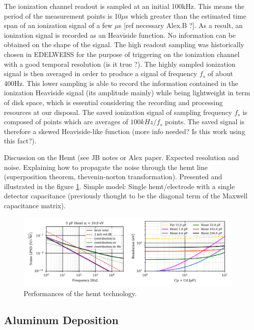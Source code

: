 The ionization channel readout is sampled at an initial 100kHz. This means the period of the  measurement points is 10$\mu$s which greater than the estimated time span of an ionization signal of a few $\mu$s [ref necessary Alex.B ?]. As a result, an ionization signal is recorded as an Heaviside function. No information can be obtained on the shape of the signal.
The high readout sampling was historically chosen in EDELWEISS for the purpose of triggering on the ionization channel with a good temporal resolution (is it true ?). The highly sampled ionization signal is then averaged in order to produce a signal of frequency $f_s$ of about 400Hz. This lower sampling is able to record the information contained in the ionization Heaviside signal (its amplitude mainly) while being lightweight in term of disk space, which is essential considering the recording and processing resources at our disposal. The saved ionization signal of sampling frequency $f_s$ is composed of points which are averages of $100kHz/f_s$ points. The saved signal is therefore a skewed Heaviside-like function (more info needed? Is this work using this fact?).

{\color{blue} Discussion on the Hemt (see JB notes or Alex paper. Expected resolution and noise.}
Explaining how to propagate the noise through the hemt line (superposition theorem, thevenin-norton transformation). Presented and illustrated in the figure \ref{fig:hemt-performances}.
Simple model: Single hemt/electrode with a single detector capacitance (previously thought to be the diagonal term of the Maxwell capacitance matrix).


\begin{figure}
\centering
\includegraphics[width=\textwidth]{Figures/Electrodes/noise_jb.png}
\caption{Performances of the hemt technology.}
\label{fig:hemt-performances}
\end{figure}

\subsection{Aluminum Deposition}

